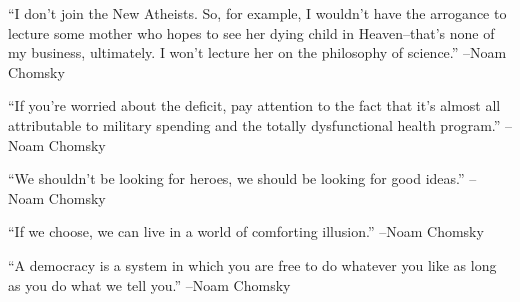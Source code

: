 \documentclass{article}%
\begin{document}
\linebreak%
\vspace{1mm}%
\begin{minipage}{\textwidth}%
\flushleft%
“I don't join the New Atheists. So, for example, I wouldn't have the arrogance to lecture some mother who hopes to see her dying child in Heaven–that's none of my business, ultimately. I won't lecture her on the philosophy of science.”%
\linebreak%
\vspace{1mm}%
–Noam Chomsky%
\linebreak%
\vspace{1mm}%
\end{minipage}%
\linebreak%
\vspace{1mm}%
\begin{minipage}{\textwidth}%
\flushleft%
“If you're worried about the deficit, pay attention to the fact that it's almost all attributable to military spending and the totally dysfunctional health program.”%
\linebreak%
\vspace{1mm}%
–Noam Chomsky%
\linebreak%
\vspace{1mm}%
\end{minipage}%
\linebreak%
\vspace{1mm}%
\begin{minipage}{\textwidth}%
\flushleft%
“We shouldn't be looking for heroes, we should be looking for good ideas.”%
\linebreak%
\vspace{1mm}%
–Noam Chomsky%
\linebreak%
\vspace{1mm}%
\end{minipage}%
\linebreak%
\vspace{1mm}%
\begin{minipage}{\textwidth}%
\flushleft%
“If we choose, we can live in a world of comforting illusion.”%
\linebreak%
\vspace{1mm}%
–Noam Chomsky%
\linebreak%
\vspace{1mm}%
\end{minipage}%
\linebreak%
\vspace{1mm}%
\begin{minipage}{\textwidth}%
\flushleft%
“A democracy is a system in which you are free to do whatever you like as long as you do what we tell you.”%
\linebreak%
\vspace{1mm}%
–Noam Chomsky%
\linebreak%
\vspace{1mm}%
\end{minipage}%
\end{document}
